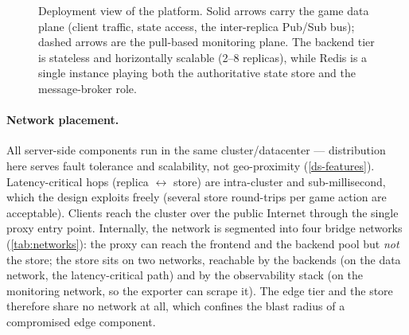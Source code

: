 \documentclass{scrartcl}
\begin{document}
\begin{figure}[H]
{%
  }
  \caption{Deployment view of the platform. Solid arrows carry the game
    data plane (client traffic, state access, the inter-replica Pub/Sub
    bus); dashed arrows are the pull-based monitoring plane. The backend
    tier is stateless and horizontally scalable (2--8 replicas), while
    Redis is a single instance playing both the authoritative state store
    and the message-broker role.}
  \label{fig:deployment}
\end{figure}

\paragraph{Network placement.}
All server-side components run in the same cluster/datacenter --- distribution
here serves fault tolerance and scalability, not geo-proximity
(\cref{ds-features}). Latency-critical hops (replica $\leftrightarrow$
store) are intra-cluster and sub-millisecond, which the design exploits
freely (several store round-trips per game action are acceptable). Clients
reach the cluster over the public Internet through the single proxy entry
point. Internally, the network is segmented into four bridge networks
(\cref{tab:networks}): the proxy can reach the frontend and the backend
pool but \emph{not} the store; the store sits on two networks, reachable by
the backends (on the data network, the latency-critical path) and by the
observability stack (on the monitoring network, so the exporter can scrape
it). The edge tier and the store therefore share no network at all, which
confines the blast radius of a compromised edge component.
\end{document}
